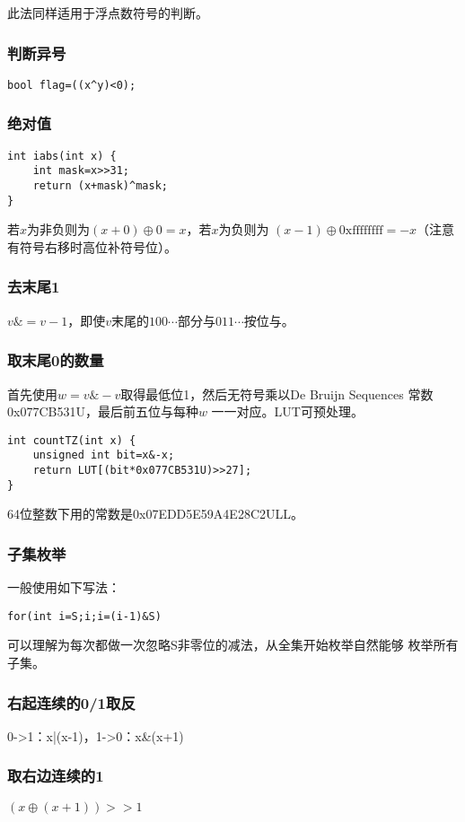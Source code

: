此法同样适用于浮点数符号的判断。
\subsubsection{判断异号}
\begin{lstlisting}
bool flag=((x^y)<0);
\end{lstlisting}
\subsubsection{绝对值}
\begin{lstlisting}
int iabs(int x) {
    int mask=x>>31;
    return (x+mask)^mask;
}
\end{lstlisting}

若$x$为非负则为$(x+0)\oplus 0=x$，若$x$为负则为
$(x-1)\oplus \textrm{0xffffffff}=-x$（注意有符号右移时高位补符号位）。
\subsubsection{去末尾1}
$v\&=v-1$，即使$v$末尾的$100\cdots$部分与$011\cdots$按位与。
\subsubsection{取末尾0的数量}
首先使用$w=v\&-v$取得最低位1，然后无符号乘以De Bruijn Sequences
常数0x077CB531U，最后前五位与每种$w$
一一对应。LUT可预处理。
\begin{lstlisting}
int countTZ(int x) {
    unsigned int bit=x&-x;
    return LUT[(bit*0x077CB531U)>>27];
}
\end{lstlisting}

64位整数下用的常数是0x07EDD5E59A4E28C2ULL。
\subsubsection{子集枚举}
一般使用如下写法：
\begin{lstlisting}
for(int i=S;i;i=(i-1)&S)
\end{lstlisting}

可以理解为每次都做一次忽略S非零位的减法，从全集开始枚举自然能够
枚举所有子集。
\subsubsection{右起连续的0/1取反}
0->1：x|(x-1)，1->0：x\&(x+1)
\subsubsection{取右边连续的1}
$(x \oplus (x+1))>>1$
